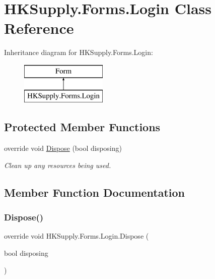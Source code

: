 \hypertarget{class_h_k_supply_1_1_forms_1_1_login}{}\section{H\+K\+Supply.\+Forms.\+Login Class Reference}
\label{class_h_k_supply_1_1_forms_1_1_login}
Inheritance diagram for H\+K\+Supply.\+Forms.\+Login\+:\begin{figure}[H]
\begin{center}
\leavevmode
\includegraphics[height=2.000000cm]{class_h_k_supply_1_1_forms_1_1_login}
\end{center}
\end{figure}
\subsection*{Protected Member Functions}
\begin{DoxyCompactItemize}
\item 
override void \hyperlink{class_h_k_supply_1_1_forms_1_1_login_a0c20fcbe198d2635836e7c7c6eebee31}{Dispose} (bool disposing)
\begin{DoxyCompactList}\small\item\em Clean up any resources being used. \end{DoxyCompactList}\end{DoxyCompactItemize}


\subsection{Member Function Documentation}
\mbox{\label{class_h_k_supply_1_1_forms_1_1_login_a0c20fcbe198d2635836e7c7c6eebee31}} 
\subsubsection{\texorpdfstring{Dispose()}{Dispose()}}
{\footnotesize\ttfamily override void H\+K\+Supply.\+Forms.\+Login.\+Dispose (\begin{DoxyParamCaption}\item[{bool}]{disposing }\end{DoxyParamCaption})\hspace{0.3cm}{\ttfamily [protected]}}




